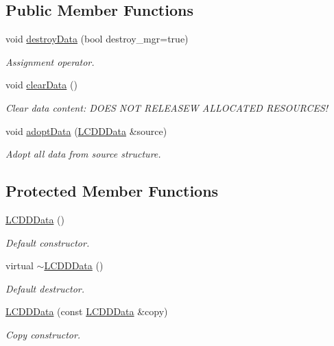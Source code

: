 \subsection*{Public Member Functions}
\begin{DoxyCompactItemize}
\item 
void \hyperlink{class_d_d4hep_1_1_geometry_1_1_l_c_d_d_data_a8c54de26155fec96a884f912f9c7a0ee}{destroyData} (bool destroy\_\-mgr=true)
\begin{DoxyCompactList}\small\item\em Assignment operator. \item\end{DoxyCompactList}\item 
void \hyperlink{class_d_d4hep_1_1_geometry_1_1_l_c_d_d_data_a6c9bd1b309c7cb21dea26dc6c1504716}{clearData} ()
\begin{DoxyCompactList}\small\item\em Clear data content: DOES NOT RELEASEW ALLOCATED RESOURCES! \item\end{DoxyCompactList}\item 
void \hyperlink{class_d_d4hep_1_1_geometry_1_1_l_c_d_d_data_a2f2797cec01fb1e6e6c6e762c9ffc170}{adoptData} (\hyperlink{class_d_d4hep_1_1_geometry_1_1_l_c_d_d_data}{LCDDData} \&source)
\begin{DoxyCompactList}\small\item\em Adopt all data from source structure. \item\end{DoxyCompactList}\end{DoxyCompactItemize}
\subsection*{Protected Member Functions}
\begin{DoxyCompactItemize}
\item 
\hyperlink{class_d_d4hep_1_1_geometry_1_1_l_c_d_d_data_a708e690646050f36f621ac61052b07cd}{LCDDData} ()
\begin{DoxyCompactList}\small\item\em Default constructor. \item\end{DoxyCompactList}\item 
virtual \hyperlink{class_d_d4hep_1_1_geometry_1_1_l_c_d_d_data_ac0b2ce6ff949288f48cdffc399f21808}{$\sim$LCDDData} ()
\begin{DoxyCompactList}\small\item\em Default destructor. \item\end{DoxyCompactList}\item 
\hyperlink{class_d_d4hep_1_1_geometry_1_1_l_c_d_d_data_abadb40a29dfebc153462c81d351cadeb}{LCDDData} (const \hyperlink{class_d_d4hep_1_1_geometry_1_1_l_c_d_d_data}{LCDDData} \&copy)
\begin{DoxyCompactList}\small\item\em Copy constructor. \item\end{DoxyCompactList}\end{DoxyCompactItemize}
